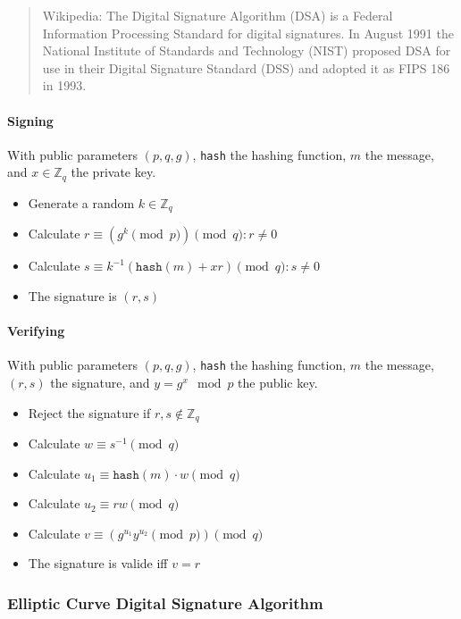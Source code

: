 \begin{quote}{Wikipedia:}
  The Digital Signature Algorithm (DSA) is a Federal Information Processing Standard
  for digital signatures. In August 1991 the National Institute of Standards and
  Technology (NIST) proposed DSA for use in their Digital Signature Standard (DSS)
  and adopted it as FIPS 186 in 1993.
\end{quote}

\paragraph{Signing}

With public parameters $(p, q, g)$, \texttt{hash} the hashing function,
$m$ the message, and $x \in \mathbb{Z}_q$ the private key.

\begin{itemize}
  \item Generate a random $k \in \mathbb{Z}_q$
  \item Calculate $r \equiv (g^k \pmod p) \pmod q : r \neq 0$
  \item Calculate $s \equiv k^{-1}(\texttt{hash}(m) + xr) \pmod q : s \neq 0$
  \item The signature is $(r, s)$
\end{itemize}

\paragraph{Verifying}

With public parameters $(p, q, g)$, \texttt{hash} the hashing function,
$m$ the message, $(r, s)$ the signature, and $y = g^x \mod p$ the public key.

\begin{itemize}
  \item Reject the signature if $r, s \notin \mathbb{Z}_q$
  \item Calculate $w \equiv s^{-1} \pmod q$
  \item Calculate $u_1 \equiv \texttt{hash}(m) \cdot w \pmod q$
  \item Calculate $u_2 \equiv rw \pmod q$
  \item Calculate $v \equiv (g^{u_1}y^{u_2} \pmod p) \pmod q$
  \item The signature is valide iff $v = r$
\end{itemize}

\subsubsection{Elliptic Curve Digital Signature Algorithm}

